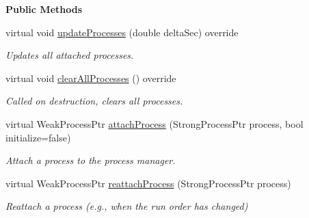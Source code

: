 \begin{Indent}\textbf{ Public Methods}\par
\begin{DoxyCompactItemize}
\item 
\mbox{\label{classrev_1_1_process_manager_a382e755525970dd7cf42d6b8d7f1466d}} 
virtual void \mbox{\hyperlink{classrev_1_1_process_manager_a382e755525970dd7cf42d6b8d7f1466d}{update\+Processes}} (double delta\+Sec) override
\begin{DoxyCompactList}\small\item\em Updates all attached processes. \end{DoxyCompactList}\item 
\mbox{\label{classrev_1_1_process_manager_aea57cc88397e36253bf73cb1c340a8d6}} 
virtual void \mbox{\hyperlink{classrev_1_1_process_manager_aea57cc88397e36253bf73cb1c340a8d6}{clear\+All\+Processes}} () override
\begin{DoxyCompactList}\small\item\em Called on destruction, clears all processes. \end{DoxyCompactList}\item 
\mbox{\label{classrev_1_1_process_manager_a1ceecd83940cb6eb29120df0d8620733}} 
virtual Weak\+Process\+Ptr \mbox{\hyperlink{classrev_1_1_process_manager_a1ceecd83940cb6eb29120df0d8620733}{attach\+Process}} (Strong\+Process\+Ptr process, bool initialize=false)
\begin{DoxyCompactList}\small\item\em Attach a process to the process manager. \end{DoxyCompactList}\item 
\mbox{\label{classrev_1_1_process_manager_a42d8d7db107b2c0964b7a3e8e059992a}} 
virtual Weak\+Process\+Ptr \mbox{\hyperlink{classrev_1_1_process_manager_a42d8d7db107b2c0964b7a3e8e059992a}{reattach\+Process}} (Strong\+Process\+Ptr process)
\begin{DoxyCompactList}\small\item\em Reattach a process (e.\+g., when the run order has changed) \end{DoxyCompactList}\item 
\mbox{\label{classrev_1_1_process_manager_af27b555fa39d0b64fb0c467691084a6b}} 

\end{DoxyCompactItemize}
\end{Indent}
